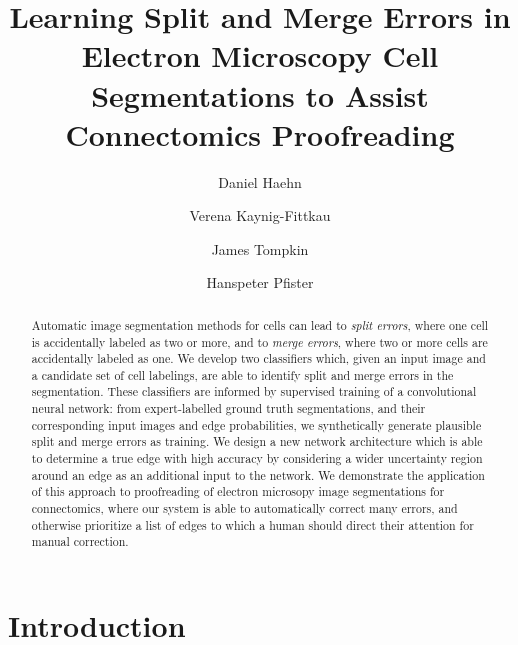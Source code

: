 \documentclass{llncs}
\begin{document}
%
\title{Learning Split and Merge Errors in Electron Microscopy Cell Segmentations to Assist Connectomics Proofreading}
%
%
\author{Daniel Haehn \and Verena Kaynig-Fittkau
\and James Tompkin \and Hanspeter Pfister}
%
%
%

\maketitle              %

\begin{abstract}
Automatic image segmentation methods for cells can lead to \emph{split errors}, where one cell is accidentally labeled as two or more, and to \emph{merge errors}, where two or more cells are accidentally labeled as one. We develop two classifiers which, given an input image and a candidate set of cell labelings, are able to identify split and merge errors in the segmentation. These classifiers are informed by supervised training of a convolutional neural network: from expert-labelled ground truth segmentations, and their corresponding input images and edge probabilities, we synthetically generate plausible split and merge errors as training. We design a new network architecture which is able to determine a true edge with high accuracy by considering a  wider uncertainty region around an edge as an additional input to the network. We demonstrate the application of this approach to proofreading of electron microsopy image segmentations for connectomics, where our system is able to automatically correct many errors, and otherwise prioritize a list of edges to which a human should direct their attention for manual correction.
\end{abstract}
%

\section{Introduction}
%
\end{document}
